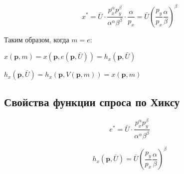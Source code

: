 \documentclass[reqno]{article}
\theoremstyle{definition}
\theoremstyle{definition}
\theoremstyle{definition}
\theoremstyle{definition}
\theoremstyle{definition}
\theoremstyle{definition}
\theoremstyle{definition}
\theoremstyle{definition}
\theoremstyle{definition}
\begin{document}
	$$x^* = \bar{U} \cdot \dfrac{p_x^\alpha p_y^\beta}{\alpha^\alpha \beta^\beta} \cdot \dfrac{\alpha}{p_x} = \bar{U} \left( \dfrac{p_y}{p_x} \dfrac{\alpha}{\beta} \right)^\beta$$
	
	Таким образом, когда $m = e$:
	
	$x(\textbf{p},m)=x(\textbf{p},e(\textbf{p},\bar{U})) = h_x (\textbf{p},\bar{U})$
	
	$h_x (\textbf{p},\bar{U}) = h_x(\textbf{p},V(\textbf{p},m)) = x(\textbf{p},m)$
	
	\subsection{Свойства функции спроса по Хиксу}
	
	$$e^* = \bar{U} \cdot \dfrac{p_x^\alpha p_y^\beta}{\alpha^\alpha \beta^\beta}$$
	
	$$h_x(\textbf{p},\bar{U}) = \bar{U} \left( \dfrac{p_y}{p_x} \dfrac{\alpha}{\beta} \right)^\beta$$ 
	
\end{document}
